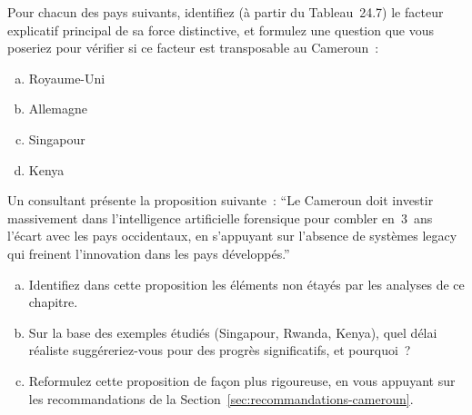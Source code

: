 \bigskip

\begin{boxexo}[title={\ding{45}\quad Exercice~24.1 --- Identifier les facteurs explicatifs \niveaubase}]
Pour chacun des pays suivants, identifiez (à partir du Tableau~24.7)
le facteur explicatif principal de sa force distinctive, et formulez
une question que vous poseriez pour vérifier si ce facteur est
transposable au Cameroun~:
\begin{enumerate}[(a)]
    \item Royaume-Uni
    \item Allemagne
    \item Singapour
    \item Kenya
\end{enumerate}
\end{boxexo}

\begin{boxexo}[title={\ding{45}\quad Exercice~24.2 --- Analyse critique d'un discours \niveaumoyen}]
Un consultant présente la proposition suivante~: ``Le Cameroun
doit investir massivement dans l'intelligence artificielle
forensique pour combler en~3~ans l'écart avec les pays occidentaux,
en s'appuyant sur l'absence de systèmes legacy qui freinent
l'innovation dans les pays développés.''
\begin{enumerate}[(a)]
    \item Identifiez dans cette proposition les éléments non
          étayés par les analyses de ce chapitre.
    \item Sur la base des exemples étudiés (Singapour, Rwanda,
          Kenya), quel délai réaliste suggéreriez-vous pour des
          progrès significatifs, et pourquoi~?
    \item Reformulez cette proposition de façon plus rigoureuse,
          en vous appuyant sur les recommandations de la
          Section~\ref{sec:recommandations-cameroun}.
\end{enumerate}
\end{boxexo}

